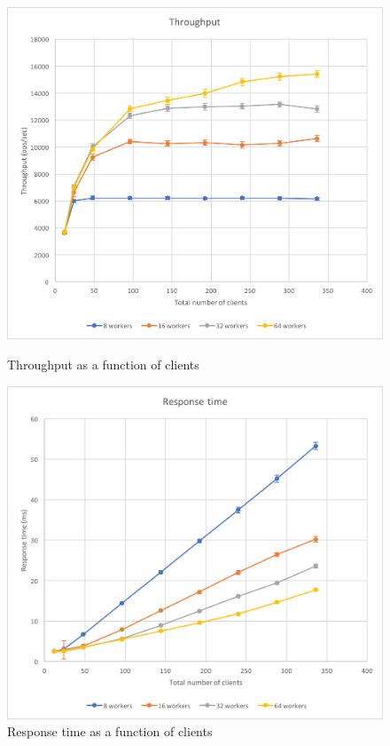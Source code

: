 \documentclass[11pt,a4paper]{article}
\begin{document}
\begin{figure}[!h]
    \centering
    \begin{minipage}[b]{.45\textwidth}
        \centering
        \includegraphics[width=\textwidth]{processing/graphics/throughput_writes_through-clients.png}
        \caption{Throughput as a function of clients}
        \label{png::throughput_writes_through-clients}
    \end{minipage}
    \qquad
    \begin{minipage}[b]{.45\textwidth}
        \centering
        \includegraphics[width=\textwidth]{processing/graphics/throughput_writes_latency-clients.png}
        \caption{Response time as a function of clients}
        \label{png::throughput_writes_latency-clients}
    \end{minipage}
\end{figure}
\end{document}

